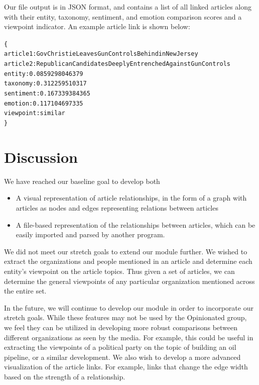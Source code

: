 \documentclass[12pt]{article}
\begin{document}
Our file output is in JSON format, and contains a list of all linked articles along with their entity, taxonomy, sentiment, and emotion comparison scores and a viewpoint indicator. An example article link is shown below:
\begin{alltt}
\{
  article 1: GovChristieLeavesGunControlsBehindinNewJersey
  article 2: RepublicanCandidatesDeeplyEntrenchedAgainstGunControls
  entity:    0.0859298046379
  taxonomy:  0.312259510317
  sentiment: 0.167339384365
  emotion:   0.117104697335
  viewpoint: similar
\}
\end{alltt}

\section{Discussion}
We have reached our baseline goal to develop both 
\begin{itemize}
\item A visual representation of article relationships, in the form of a graph with articles as nodes and edges representing relations between articles
\item A file-based representation of the relationships between articles, which can be easily imported and parsed by another program.
\end{itemize}
We did not meet our stretch goals to extend our module further. We wished to extract the organizations and people mentioned in an article and determine each entity's viewpoint on the article topics. Thus given a set of articles, we can determine the general viewpoints of any particular organization mentioned across the entire set.

In the future, we will continue to develop our module in order to incorporate our stretch goals. While these features may not be used by the Opinionated group, we feel they can be utilized in developing more robust comparisons between different organizations as seen by the media. For example, this could be useful in extracting the viewpoints of a political party on the topic of building an oil pipeline, or a similar development. We also wish to develop a more advanced visualization of the article links. For example, links that change the edge width based on the strength of a relationship.
\end{document}

